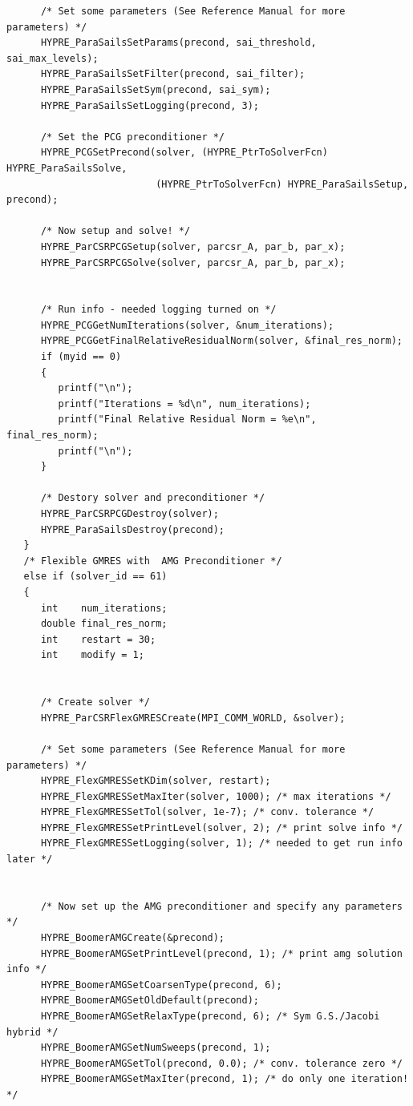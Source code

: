 \documentclass[a4paper,10pt]{article}
\begin{document}
\begin{lstlisting}
      /* Set some parameters (See Reference Manual for more parameters) */
      HYPRE_ParaSailsSetParams(precond, sai_threshold, sai_max_levels);
      HYPRE_ParaSailsSetFilter(precond, sai_filter);
      HYPRE_ParaSailsSetSym(precond, sai_sym);
      HYPRE_ParaSailsSetLogging(precond, 3);

      /* Set the PCG preconditioner */
      HYPRE_PCGSetPrecond(solver, (HYPRE_PtrToSolverFcn) HYPRE_ParaSailsSolve,
                          (HYPRE_PtrToSolverFcn) HYPRE_ParaSailsSetup, precond);

      /* Now setup and solve! */
      HYPRE_ParCSRPCGSetup(solver, parcsr_A, par_b, par_x);
      HYPRE_ParCSRPCGSolve(solver, parcsr_A, par_b, par_x);


      /* Run info - needed logging turned on */
      HYPRE_PCGGetNumIterations(solver, &num_iterations);
      HYPRE_PCGGetFinalRelativeResidualNorm(solver, &final_res_norm);
      if (myid == 0)
      {
         printf("\n");
         printf("Iterations = %d\n", num_iterations);
         printf("Final Relative Residual Norm = %e\n", final_res_norm);
         printf("\n");
      }

      /* Destory solver and preconditioner */
      HYPRE_ParCSRPCGDestroy(solver);
      HYPRE_ParaSailsDestroy(precond);
   }
   /* Flexible GMRES with  AMG Preconditioner */
   else if (solver_id == 61)
   {
      int    num_iterations;
      double final_res_norm;
      int    restart = 30;
      int    modify = 1;


      /* Create solver */
      HYPRE_ParCSRFlexGMRESCreate(MPI_COMM_WORLD, &solver);

      /* Set some parameters (See Reference Manual for more parameters) */
      HYPRE_FlexGMRESSetKDim(solver, restart);
      HYPRE_FlexGMRESSetMaxIter(solver, 1000); /* max iterations */
      HYPRE_FlexGMRESSetTol(solver, 1e-7); /* conv. tolerance */
      HYPRE_FlexGMRESSetPrintLevel(solver, 2); /* print solve info */
      HYPRE_FlexGMRESSetLogging(solver, 1); /* needed to get run info later */


      /* Now set up the AMG preconditioner and specify any parameters */
      HYPRE_BoomerAMGCreate(&precond);
      HYPRE_BoomerAMGSetPrintLevel(precond, 1); /* print amg solution info */
      HYPRE_BoomerAMGSetCoarsenType(precond, 6);
      HYPRE_BoomerAMGSetOldDefault(precond);
      HYPRE_BoomerAMGSetRelaxType(precond, 6); /* Sym G.S./Jacobi hybrid */
      HYPRE_BoomerAMGSetNumSweeps(precond, 1);
      HYPRE_BoomerAMGSetTol(precond, 0.0); /* conv. tolerance zero */
      HYPRE_BoomerAMGSetMaxIter(precond, 1); /* do only one iteration! */


\end{lstlisting}
\end{document}

